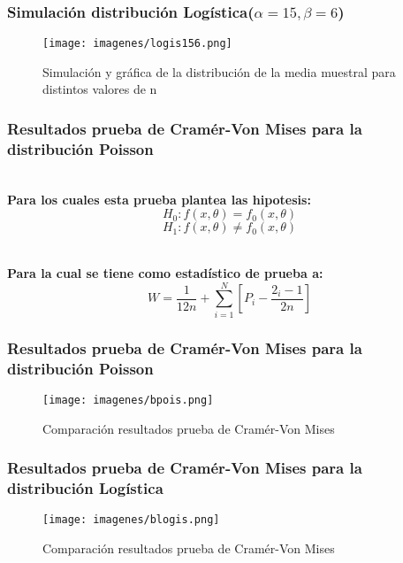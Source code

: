 \documentclass[12pt]{beamer}
\begin{document}
\begin{frame}
\frametitle{Simulación distribución Logística($\alpha=15,\beta=6$) }
\begin{figure}
\centering
\texttt{[image: imagenes/logis156.png]}
\caption{Simulación y gráfica de la distribución de la media muestral para distintos valores de n}\label{figura2}
\end{figure}
\end{frame}


\begin{frame}
\frametitle{Resultados prueba de Cramér-Von Mises para la distribución Poisson}
~\\ \textbf{Para los cuales esta prueba plantea las hipotesis:}
$$H_{0}:f(x,\theta)=f_{0}(x,\theta)$$
$$H_{1}:f(x,\theta)\neq f_{0}(x,\theta) $$ 

~\\ \textbf{Para la cual se tiene como estadístico de prueba a:}
$$ W = \frac{1}{12n} + \displaystyle\sum_{i=1}^N [P_i - \frac{2_i - 1 }{2n}] $$
\end{frame}

\begin{frame}
\frametitle{Resultados prueba de Cramér-Von Mises para la distribución Poisson}
\begin{figure}
\centering
\texttt{[image: imagenes/bpois.png]}
\caption{Comparación resultados prueba de Cramér-Von Mises}\label{figura2}
\end{figure}
\end{frame}

\begin{frame}
\frametitle{Resultados prueba de Cramér-Von Mises para la distribución Logística}
\begin{figure}
\centering
\texttt{[image: imagenes/blogis.png]}
\caption{Comparación resultados prueba de Cramér-Von Mises}\label{figura2}
\end{figure}
\end{frame}
\end{document}
